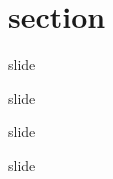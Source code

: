 \documentclass[../quali_slides.tex]{subfiles}
\begin{document}
\section{section}


\begin{frame}{slide}
	
	slide
	
\end{frame}


\begin{frame}{slide}
	
	slide
	
\end{frame}
\end{document}
